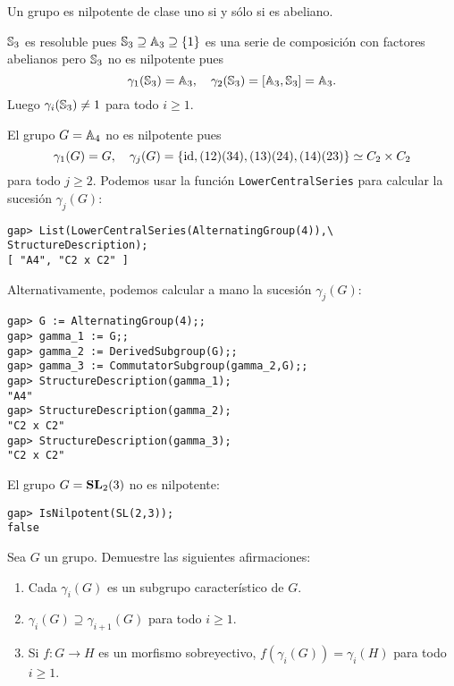 \begin{example}
	Un grupo es nilpotente de clase uno si y sólo si es abeliano.
\end{example}

\begin{example}
	$\mathbb{S}_3$ es resoluble pues $\mathbb{S}_3\supseteq \mathbb{A}_3\supseteq\{1\}$ es una serie
	de composición con factores abelianos pero $\mathbb{S}_3$ no es nilpotente pues
	\[
		\gamma_1(\mathbb{S}_3)=\mathbb{A}_3,\quad
		\gamma_2(\mathbb{S}_3)=[\mathbb{A}_3,\mathbb{S}_3]=\mathbb{A}_3.
	\]
	Luego $\gamma_i(\mathbb{S}_3)\ne1$ para todo $i\geq1$. 
\end{example}

\begin{example}
	El grupo $G=\mathbb{A}_4$ no es nilpotente pues 
	\[
		\gamma_1(G)=G,\quad
		\gamma_j(G)=\{\operatorname{id},(12)(34),(13)(24),(14)(23)\}\simeq C_2\times C_2
	\]
	para todo $j\geq2$. Podemos usar la función \lstinline{LowerCentralSeries}
	para calcular la sucesión $\gamma_j(G)$:
	\begin{lstlisting}
gap> List(LowerCentralSeries(AlternatingGroup(4)),\
StructureDescription);
[ "A4", "C2 x C2" ]
	\end{lstlisting}
	Alternativamente, podemos calcular a mano la sucesión $\gamma_j(G)$: 
	\begin{lstlisting}
gap> G := AlternatingGroup(4);;
gap> gamma_1 := G;;
gap> gamma_2 := DerivedSubgroup(G);;
gap> gamma_3 := CommutatorSubgroup(gamma_2,G);;
gap> StructureDescription(gamma_1);
"A4"
gap> StructureDescription(gamma_2);
"C2 x C2"
gap> StructureDescription(gamma_3);
"C2 x C2"
	\end{lstlisting}
\end{example}

\begin{example}
	El grupo $G=\mathbf{SL}_2(3)$ no es nilpotente:
	\begin{lstlisting}
gap> IsNilpotent(SL(2,3));
false
	\end{lstlisting}
\end{example}

\begin{exercise}
	\label{xca:gamma}
	Sea $G$ un grupo. Demuestre las siguientes afirmaciones:
	\begin{enumerate}
		\item Cada $\gamma_i(G)$ es un subgrupo característico de $G$.
		\item $\gamma_i(G)\supseteq\gamma_{i+1}(G)$ para todo $i\geq1$.
		\item Si $f\colon G\to H$ es un morfismo sobreyectivo,
			$f(\gamma_i(G))=\gamma_i(H)$ para todo $i\geq1$.
	\end{enumerate}
\end{exercise}



